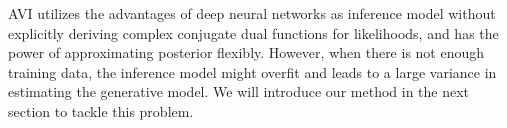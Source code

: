 AVI utilizes the advantages of deep neural networks as inference model without explicitly deriving complex conjugate dual functions for likelihoods, and has the power of approximating posterior flexibly. However, when there is not enough training data, the inference model might  overfit and leads to a large variance in estimating the generative model. We will introduce our method in the next section to tackle this problem.




